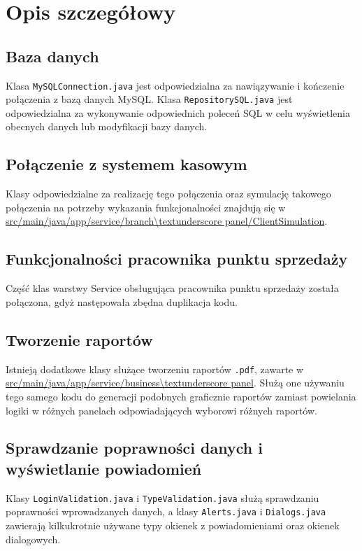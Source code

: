 \documentclass[a4paper,12pt]{article}
\begin{document}
\section{Opis szczegółowy}

\subsection{Baza danych}

Klasa \texttt{MySQLConnection.java} jest odpowiedzialna za nawiązywanie i kończenie połączenia z bazą danych MySQL.
Klasa \texttt{RepositorySQL.java} jest odpowiedzialna za wykonywanie odpowiednich poleceń SQL w celu wyświetlenia obecnych danych lub modyfikacji bazy danych.

\subsection{Połączenie z systemem kasowym}

Klasy odpowiedzialne za realizację tego połączenia oraz symulację takowego połączenia na potrzeby wykazania funkcjonalności znajdują się w \url{src/main/java/app/service/branch\textunderscore panel/ClientSimulation}.

\subsection{Funkcjonalności pracownika punktu sprzedaży}

Część klas warstwy Service obsługująca pracownika punktu sprzedaży została połączona, gdyż następowała zbędna duplikacja kodu.

\subsection{Tworzenie raportów}

Istnieją dodatkowe klasy służące tworzeniu raportów \texttt{.pdf}, zawarte w \url{src/main/java/app/service/business\textunderscore panel}.
Służą one używaniu tego samego kodu do generacji podobnych graficznie raportów zamiast powielania logiki w różnych panelach odpowiadających wyborowi różnych raportów.

\subsection{Sprawdzanie poprawności danych i wyświetlanie powiadomień}

Klasy \texttt{LoginValidation.java} i \texttt{TypeValidation.java} służą sprawdzaniu poprawności wprowadzanych danych, a klasy \texttt{Alerts.java} i \texttt{Dialogs.java} zawierają kilkukrotnie używane typy okienek z powiadomieniami oraz okienek dialogowych.
\end{document}
